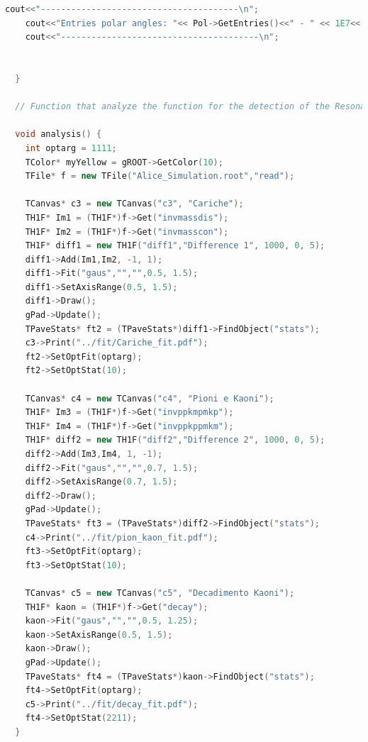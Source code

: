 \documentclass[a4paper, 11pt]{article}
\begin{document}
\begin{lstlisting}[language=c++, style=code]
    cout<<"---------------------------------------\n";
    cout<<"Entries polar angles: "<< Pol->GetEntries()<<" - " << 1E7<<'\n';
    cout<<"---------------------------------------\n";


  }

  // Function that analyze the function for the detection of the Resonance Kaon //////////

  void analysis() {
    int optarg = 1111;
    TColor* myYellow = gROOT->GetColor(10);
    TFile* f = new TFile("Alice_Simulation.root","read");

    TCanvas* c3 = new TCanvas("c3", "Cariche");
    TH1F* Im1 = (TH1F*)f->Get("invmassdis");
    TH1F* Im2 = (TH1F*)f->Get("invmasscon");
    TH1F* diff1 = new TH1F("diff1","Difference 1", 1000, 0, 5);
    diff1->Add(Im1,Im2, -1, 1);
    diff1->Fit("gaus","","",0.5, 1.5);
    diff1->SetAxisRange(0.5, 1.5);
    diff1->Draw();
    gPad->Update();
    TPaveStats* ft2 = (TPaveStats*)diff1->FindObject("stats");
    c3->Print("../fit/Cariche_fit.pdf");
    ft2->SetOptFit(optarg);
    ft2->SetOptStat(10);

    TCanvas* c4 = new TCanvas("c4", "Pioni e Kaoni");
    TH1F* Im3 = (TH1F*)f->Get("invppkmpmkp");
    TH1F* Im4 = (TH1F*)f->Get("invppkppmkm");
    TH1F* diff2 = new TH1F("diff2","Difference 2", 1000, 0, 5);
    diff2->Add(Im3,Im4, 1, -1);
    diff2->Fit("gaus","","",0.7, 1.5);
    diff2->SetAxisRange(0.7, 1.5);
    diff2->Draw();
    gPad->Update();
    TPaveStats* ft3 = (TPaveStats*)diff2->FindObject("stats");
    c4->Print("../fit/pion_kaon_fit.pdf");
    ft3->SetOptFit(optarg);
    ft3->SetOptStat(10);

    TCanvas* c5 = new TCanvas("c5", "Decadimento Kaoni");
    TH1F* kaon = (TH1F*)f->Get("decay");
    kaon->Fit("gaus","","",0.5, 1.25);
    kaon->SetAxisRange(0.5, 1.5);
    kaon->Draw();
    gPad->Update();
    TPaveStats* ft4 = (TPaveStats*)kaon->FindObject("stats");
    ft4->SetOptFit(optarg);
    c5->Print("../fit/decay_fit.pdf");
    ft4->SetOptStat(2211);
  }
      \end{lstlisting}
\end{document}

